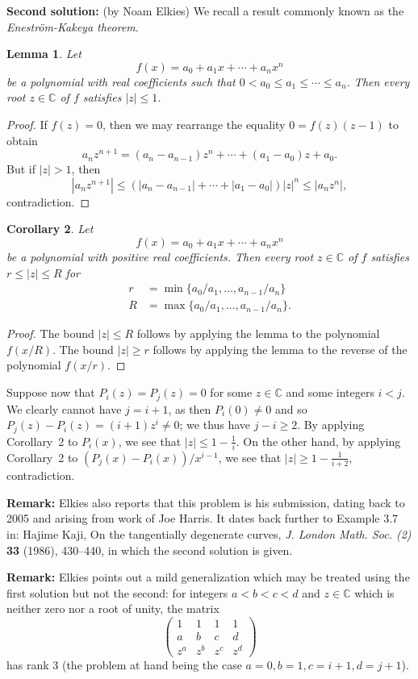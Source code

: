 \documentclass[amssymb,twocolumn,pra,10pt,aps]{revtex4-1}
\newtheorem{lemma}{Lemma}
\newtheorem{cor}[lemma]{Corollary}
\newcommand{\CC}{\mathbb{C}}
\begin{document}
\begin{itemize}
\noindent
\textbf{Second solution:}
\setcounter{lemma}{0}
(by Noam Elkies)
We recall a result commonly known as the \emph{Enestr\"om-Kakeya theorem}.
\begin{lemma}
Let 
\[
f(x) = a_0 + a_1 x + \cdots + a_n x^n
\]
be a polynomial with real coefficients such that $0 < a_0 \leq a_1 \leq \cdots \leq a_n$.
Then every root $z \in \CC$ of $f$ satisfies $|z| \leq 1$.
\end{lemma}
\begin{proof}
If $f(z) = 0$, then we may rearrange the equality $0 = f(z)(z-1)$ to obtain
\[
a_n z^{n+1} = (a_n - a_{n-1}) z^n + \cdots + (a_1 - a_0)z + a_0.
\]
But if $|z| > 1$, then 
\[
|a_n z^{n+1}| \leq (|a_n - a_{n-1}| + \cdots + |a_1 - a_0|) |z|^{n}
\leq |a_n z^{n}|,
\]
contradiction.
\end{proof}
\begin{cor}
Let 
\[
f(x) = a_0 + a_1 x + \cdots + a_n x^n
\]
be a polynomial with positive real coefficients. Then every root $z \in \CC$ of $f$ satisfies $r \leq |z| \leq R$ for
\begin{align*}
r &= \min\{a_0/a_1, \dots, a_{n-1}/a_n\} \\
R &= \max\{a_0/a_1, \dots, a_{n-1}/a_n\}.
\end{align*}
\end{cor}
\begin{proof}
The bound $|z| \leq R$ follows by applying the lemma to the polynomial $f(x/R)$.
The bound $|z| \geq r$ follows by applying the lemma to the reverse of the polynomial $f(x/r)$.
\end{proof}
Suppose now that $P_i(z) = P_j(z) = 0$ for some $z \in \CC$ and some integers $i < j$. 
We clearly cannot have $j = i+1$, as then $P_i(0) \neq 0$ and so $P_j(z) - P_i(z) = (i+1) z^i \neq 0$; we thus have $j-i \geq 2$.
By applying Corollary~2 to $P_i(x)$, we see that $|z| \leq 1 - \frac{1}{i}$. On the other hand, by applying Corollary~2 to $(P_j(x) - P_i(x))/x^{i-1}$, we see that $|z| \geq 1 - \frac{1}{i+2}$, contradiction.

\noindent
\textbf{Remark:} Elkies also reports that this problem is his submission, dating back to 2005 and arising from work of Joe Harris.
It dates back further to Example 3.7 in: Hajime Kaji,
On the tangentially degenerate curves,
\textit{J. London Math. Soc. (2)} \textbf{33} (1986), 430--440, in which the second solution is given.

\noindent
\textbf{Remark:}
Elkies points out a mild generalization which may be treated using the first solution but not the second: for integers $a<b<c<d$ and $z \in \CC$
which is neither zero nor a root of unity, the matrix
\[
\begin{pmatrix}
1 & 1 & 1 & 1 \\
a & b & c & d \\
z^a & z^b & z^c & z^d
\end{pmatrix}
\]
has rank 3 (the problem at hand being the case $a=0, b=1, c=i+1, d=j+1$).


\end{itemize}
\end{document}
